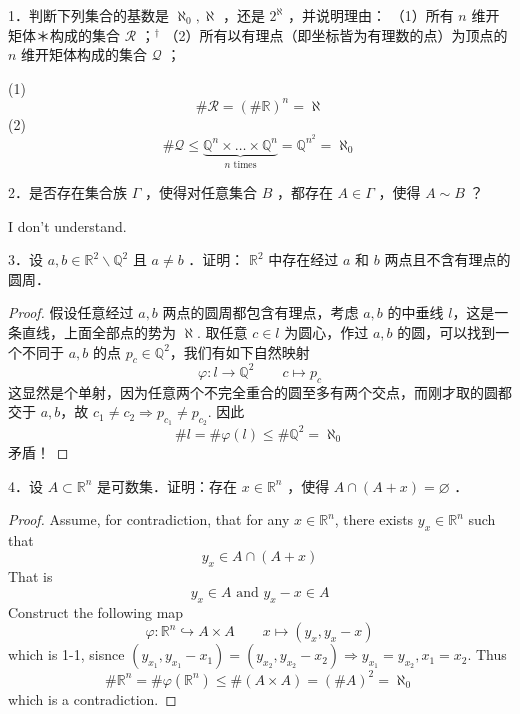 \begin{exercise}
1．判断下列集合的基数是 $\aleph_0, \aleph$ ，还是 $2^{\aleph}$ ，并说明理由：
（1）所有 $n$ 维开矩体＊构成的集合 $\mathscr{R}$ ；${ }^{\dagger}$
（2）所有以有理点（即坐标皆为有理数的点）为顶点的 $n$ 维开矩体构成的集合 $\mathscr{Q}$ ；
\end{exercise}
(1)
\[
\#\mathscr{R}=(\#\mathbb{R})^{n}=\aleph
\]
(2)
\[
\#\mathscr{Q}\leq \underbrace{ \mathbb{Q}^{n}\times\dots \times \mathbb{Q}^{n} }_{ n \text{ times} }=\mathbb{Q}^{n^{2}}=\aleph_0
\]
\begin{exercise}
2．是否存在集合族 $\Gamma$ ，使得对任意集合 $B$ ，都存在 $A \in \Gamma$ ，使得 $A \sim B$ ？
\end{exercise}
I don't understand.

\begin{exercise}
3．设 $a, b \in \mathbb{R}^2 \backslash \mathbb{Q}^2$ 且 $a \neq b$ ．证明： $\mathbb{R}^2$ 中存在经过 $a$ 和 $b$ 两点且不含有理点的圆周．
\end{exercise}
\begin{proof}
假设任意经过 $a,b$ 两点的圆周都包含有理点，考虑 $a,b$ 的中垂线 $l$，这是一条直线，上面全部点的势为 $\aleph$. 取任意 $c\in l$ 为圆心，作过 $a,b$ 的圆，可以找到一个不同于 $a,b$ 的点 $p_{c}\in \mathbb{Q}^{2}$，我们有如下自然映射
\[
\varphi:l \to \mathbb{Q}^{2}\qquad c\mapsto p_{c}
\]
这显然是个单射，因为任意两个不完全重合的圆至多有两个交点，而刚才取的圆都交于 $a,b$，故 $c_1\neq c_2\Rightarrow p_{c_1}\neq p_{c_2}$. 因此
\[
\#l=\#\varphi(l)\leq \#\mathbb{Q}^{2}=\aleph_0
\]
矛盾！
\end{proof}

\begin{exercise}
4．设 $A \subset \mathbb{R}^n$ 是可数集．证明：存在 $x \in \mathbb{R}^n$ ，使得 $A \cap(A+x)=\varnothing$ ．
\end{exercise}
\begin{proof}
Assume, for contradiction, that for any $x\in \mathbb{R}^{n}$, there exists $y_{x}\in \mathbb{R}^{n}$ such that
\[
y_{x}\in A\cap(A+x)
\]
That is
\[
y_{x}\in A\text{ and }y_{x}-x\in A
\]
Construct the following map
\[
\varphi:\mathbb{R}^{n}\hookrightarrow A\times A\qquad x\longmapsto(y_{x},y_{x}-x)
\]
which is 1-1, sisnce $(y_{x_1},y_{x_1}-x_1)=(y_{x_2},y_{x_2}-x_2)\Rightarrow y_{x_1}=y_{x_2},x_1=x_2$. Thus
\[
\#\mathbb{R}^{n}=\#\varphi(\mathbb{R}^{n})\leq \#(A\times A)=(\#A)^{2}=\aleph_0
\]
which is a contradiction.
\end{proof}

